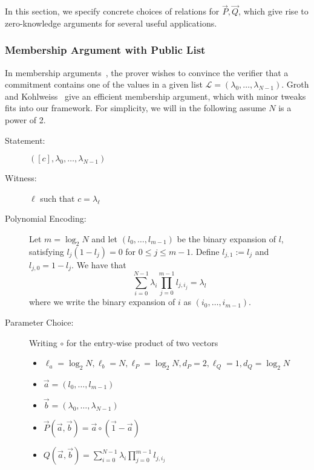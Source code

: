 In this section, we specify concrete choices of relations for $\vec{P},\vec{Q}$, which give rise to zero-knowledge arguments for several useful applications.

\subsubsection{Membership Argument with Public List}\label{app:member}
In membership arguments~\cite{BS01,BDD07}, the prover wishes to convince the verifier that a commitment contains one of the values in a given list $\mathcal{L}=(\lambda_0,\ldots,\lambda_{N-1})$. Groth and Kohlweiss~\cite{GrothK15} give an efficient membership argument, which with minor tweaks fits into our framework. For simplicity, we will in the following assume $N$ is a power of 2.
\begin{description}
\item[ Statement: ] $([c],\lambda_0,\ldots,\lambda_{N-1})$
\item[ Witness: ] $\ell$ such that $c =\lambda_\ell$
\item[ Polynomial Encoding: ] Let $m = \log_2 N$ and let $(l_0,\ldots,l_{m-1})$ be the binary expansion of $l$, satisfying $l_j ( 1 - l_j) = 0$ for $0 \leq j \leq m-1$. Define $l_{j,1} :=l_j$ and $l_{j,0} = 1-l_j$. We have that $$\sum_{i=0}^{N-1} \lambda_i \prod_{j=0}^{m-1} l_{j,i_j} = \lambda_l $$ where we write the binary expansion of $i$ as $(i_0,\ldots,i_{m-1})$.
\item[ Parameter Choice: ] Writing $\circ$ for the entry-wise product of two vectors
\begin{itemize}
\item $\ell_a=\log_2 N, \ell_b=N, \ell_P=\log_2 N, d_P=2, \ell_Q=1, d_Q=\log_2 N$ 
\item $\vec{a} = (l_0,\ldots,l_{m-1})$
\item $\vec{b} = (\lambda_0,\ldots,\lambda_{N-1})$
\item $\vec{P}(\vec{a},\vec{b}) = \vec{a} \circ ( \vec{1} - \vec{a} )$
\item $Q(\vec{a},\vec{b}) = \sum_{i=0}^{N-1} \lambda_i \prod_{j=0}^{m-1} l_{j,i_j}$
\end{itemize}
\end{description}

